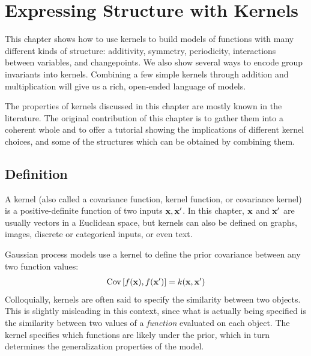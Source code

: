 
\inbpdocument

\chapter{Expressing Structure with Kernels}
\label{ch:kernels}

This chapter shows how to use kernels to build models of functions with many different kinds of structure: additivity, symmetry, periodicity, interactions between variables, and changepoints.
We also show several ways to encode group invariants into kernels.
Combining a few simple kernels through addition and multiplication will give us a rich, open-ended language of models.

The properties of kernels discussed in this chapter are mostly known in the literature.
The original contribution of this chapter is to gather them into a coherent whole and to offer a tutorial showing the implications of different kernel choices, and some of the structures which can be obtained by combining them.


\section{Definition}

A kernel (also called a covariance function, kernel function, or covariance kernel) is a positive-definite function of two inputs ${\bf{x}}, {\bf{x}}'$. %
In this chapter, ${\bf{x}}$ and ${\bf{x}}'$ are usually vectors in a Euclidean space, but kernels can also be defined on graphs, images, discrete or categorical inputs, or even text.

Gaussian process models use a kernel to define the prior covariance between any two function values:
%
\begin{align}
\textrm{Cov} \left[f({\bf{x}}), f({\bf{x}}') \right] = k({\bf{x}},{\bf{x}}')
\end{align}
%
Colloquially, kernels are often said to specify the similarity between two objects.
This is slightly misleading in this context, since what is actually being specified is the similarity between two values of a \emph{function} evaluated on each object.
The kernel specifies which functions are likely under the \gp{} prior, which in turn determines the generalization properties of the model.





